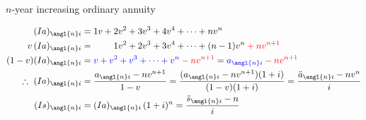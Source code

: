 \documentclass{beamer}
\begin{document}
\begin{frame}{$n$-year increasing ordinary annuity}

\begin{center}
\end{center}

\vspace{-1ex}
\small
\begin{align*}
(Ia)_{\angl{n}i} &= 1v + 2v^2 + 3v^3 + 4v^4 + \cdots + nv^n \\
v\,(Ia)_{\angl{n}i} &= \phantom{1v + {}} 1v^2 + 2v^3 + 3v^4 + \cdots + (n-1)v^n \textcolor{red}{{}+ nv^{n+1}} \\
(1-v)(Ia)_{\angl{n}i} &= \blue{v + v^2 + v^3 + \cdots + v^n} \textcolor{red}{{}- nv^{n+1}} = \blue{a_{\angl{n}i}} \textcolor{red}{{}- nv^{n+1}} \\
\therefore\ (Ia)_{\angl{n}i} &= \frac{a_{\angl{n}i} - nv^{n+1}}{1-v} = \frac{(a_{\angl{n}i} - nv^{n+1})(1+i)}{(1-v)(1+i)} = \frac{\ddot{a}_{\angl{n}i} - nv^n}{i} \\
(Is)_{\angl{n}i} &= (Ia)_{\angl{n}i}\,(1+i)^n = \frac{\ddot{s}_{\angl{n}i} - n}{i}
\end{align*}

\end{frame}
\end{document}
